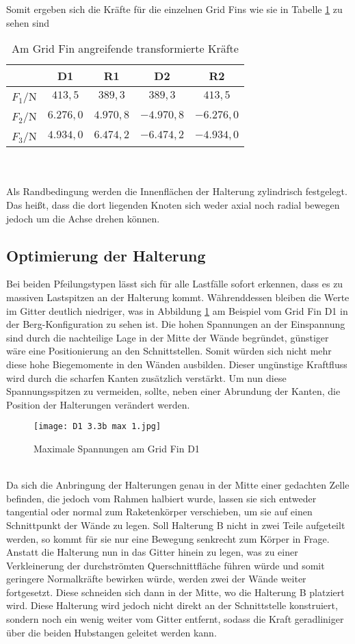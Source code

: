 Somit ergeben sich die Kräfte für die einzelnen Grid Fins wie sie in Tabelle \ref{tab_Fs} zu sehen sind
\begin{table}[ht]
	\centering
	\caption{Am Grid Fin angreifende transformierte Kräfte}
	\label{tab_Fs}
	\begin{tabular}{c||c|c|c|c}
		&D1&R1&D2&R2\\
		\hline
		$F_1/$N&$413,5$&$389,3$&$389,3$&$413,5$\\
		$F_2/$N&$6.276,0$&$4.970,8$&$-4.970,8$&$-6.276,0$\\
		$F_3/$N&$4.934,0$&$6.474,2$&$-6.474,2$&$-4.934,0$\\
	\end{tabular}
\end{table}\\~\\
Als Randbedingung werden die Innenflächen der Halterung zylindrisch festgelegt. Das heißt, dass die dort liegenden Knoten sich weder axial noch radial bewegen jedoch um die Achse drehen können.
\subsection{Optimierung der Halterung}
Bei beiden Pfeilungstypen lässt sich für alle Lastfälle sofort erkennen, dass es zu massiven Lastspitzen an der Halterung kommt. Währenddessen bleiben die Werte im Gitter deutlich niedriger, was in Abbildung \ref{abb_V1-D1} am Beispiel vom Grid Fin D1 in der Berg-Konfiguration zu sehen ist. Die hohen Spannungen an der Einspannung sind durch die nachteilige Lage in der Mitte der Wände begründet, günstiger wäre eine Positionierung an den Schnittstellen. Somit würden sich nicht mehr diese hohe Biegemomente in den Wänden ausbilden. Dieser ungünstige Kraftfluss wird durch die scharfen Kanten zusätzlich verstärkt. Um nun diese Spannungsspitzen zu vermeiden, sollte, neben einer Abrundung der Kanten, die Position der Halterungen verändert werden.
\begin{figure}[h] 
	\centering
	\texttt{[image: D1 3.3b max 1.jpg]}
	\caption{Maximale Spannungen am Grid Fin D1}
	\label{abb_V1-D1}
\end{figure}\\
Da sich die Anbringung der Halterungen genau in der Mitte einer gedachten Zelle befinden, die jedoch vom Rahmen halbiert wurde, lassen sie sich entweder tangential oder normal zum Raketenkörper verschieben, um sie auf einen Schnittpunkt der Wände zu legen. Soll Halterung B nicht in zwei Teile aufgeteilt werden, so kommt für sie nur eine Bewegung senkrecht zum Körper in Frage. Anstatt die Halterung nun in das Gitter hinein zu legen, was zu einer Verkleinerung der durchströmten Querschnittfläche führen würde und somit geringere Normalkräfte bewirken würde, werden zwei der Wände weiter fortgesetzt. Diese schneiden sich dann in der Mitte, wo die Halterung B platziert wird. Diese Halterung wird jedoch nicht direkt an der Schnittstelle konstruiert, sondern noch ein wenig weiter vom Gitter entfernt, sodass die Kraft geradliniger über die beiden Hubstangen geleitet werden kann.

